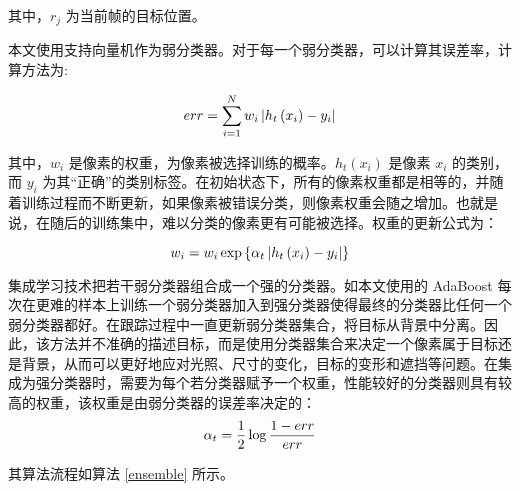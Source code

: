 其中，$r_j$ 为当前帧的目标位置。

本文使用支持向量机作为弱分类器。对于每一个弱分类器，可以计算其误差率，计算方法为:
\vspace{0.3cm}

\begin{equation}
e r r=\sum_{i=1}^N w_i\left|h_t\left(x_i\right)-y_i\right|
\vspace{0.3cm}
\end{equation}

其中，$w_i$ 是像素的权重，为像素被选择训练的概率。$h_t\left(x_i\right)$ 是像素 $x_i$ 的类别，而 $y_i$ 为其“正确”的类别标签。在初始状态下，所有的像素权重都是相等的，并随着训练过程而不断更新，如果像素被错误分类，则像素权重会随之增加。也就是说，在随后的训练集中，难以分类的像素更有可能被选择。权重的更新公式为：
\vspace{0.3cm}

\begin{equation}
w_i=w_i \exp \left\{\alpha_t\left|h_t\left(x_i\right)-y_i\right|\right\}
\vspace{0.3cm}
\end{equation}


集成学习技术把若干弱分类器组合成一个强的分类器。如本文使用的 AdaBoost 每次在更难的样本上训练一个弱分类器加入到强分类器使得最终的分类器比任何一个弱分类器都好。在跟踪过程中一直更新弱分类器集合，将目标从背景中分离。因此，该方法并不准确的描述目标，而是使用分类器集合来决定一个像素属于目标还是背景，从而可以更好地应对光照、尺寸的变化，目标的变形和遮挡等问题。在集成为强分类器时，需要为每个若分类器赋予一个权重，性能较好的分类器则具有较高的权重，该权重是由弱分类器的误差率决定的：
\vspace{0.3cm}
\begin{equation}
\alpha_t=\frac{1}{2} \log \frac{1-e r r}{e r r}
\vspace{0.3cm}
\end{equation}

其算法流程如算法 \ref{ensemble} 所示。

